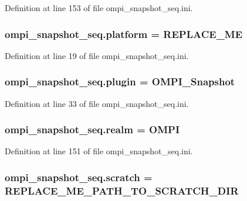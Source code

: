 Definition at line 153 of file ompi\-\_\-snapshot\-\_\-seq.\-ini.

\hypertarget{namespaceompi__snapshot__seq_a300d0cc664225df572aad2518569d7bf}{
\subsubsection[{platform}]{\setlength{\rightskip}{0pt plus 5cm}ompi\-\_\-snapshot\-\_\-seq.\-platform = R\-E\-P\-L\-A\-C\-E\-\_\-\-M\-E}}\label{namespaceompi__snapshot__seq_a300d0cc664225df572aad2518569d7bf}


Definition at line 19 of file ompi\-\_\-snapshot\-\_\-seq.\-ini.

\hypertarget{namespaceompi__snapshot__seq_a4964274b9eb87e06a95ee1bef66604ef}{
\subsubsection[{plugin}]{\setlength{\rightskip}{0pt plus 5cm}ompi\-\_\-snapshot\-\_\-seq.\-plugin = O\-M\-P\-I\-\_\-\-Snapshot}}\label{namespaceompi__snapshot__seq_a4964274b9eb87e06a95ee1bef66604ef}


Definition at line 33 of file ompi\-\_\-snapshot\-\_\-seq.\-ini.

\hypertarget{namespaceompi__snapshot__seq_aab43e86098df5461b6d69d6554bacf51}{
\subsubsection[{realm}]{\setlength{\rightskip}{0pt plus 5cm}ompi\-\_\-snapshot\-\_\-seq.\-realm = O\-M\-P\-I}}\label{namespaceompi__snapshot__seq_aab43e86098df5461b6d69d6554bacf51}


Definition at line 151 of file ompi\-\_\-snapshot\-\_\-seq.\-ini.

\hypertarget{namespaceompi__snapshot__seq_a8855b0a58b147479b623ede37dab8378}{
\subsubsection[{scratch}]{\setlength{\rightskip}{0pt plus 5cm}ompi\-\_\-snapshot\-\_\-seq.\-scratch = R\-E\-P\-L\-A\-C\-E\-\_\-\-M\-E\-\_\-\-P\-A\-T\-H\-\_\-\-T\-O\-\_\-\-S\-C\-R\-A\-T\-C\-H\-\_\-\-D\-I\-R}}\label{namespaceompi__snapshot__seq_a8855b0a58b147479b623ede37dab8378}


